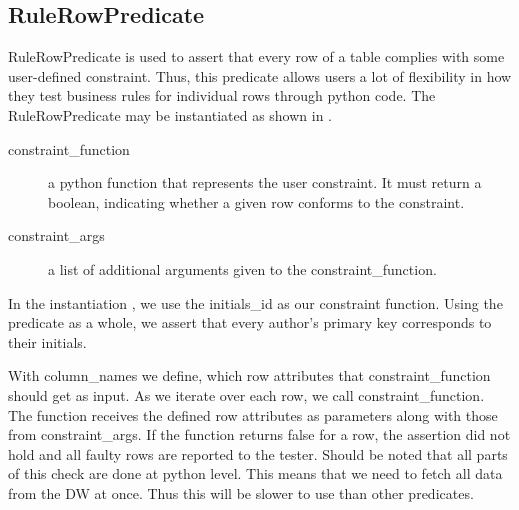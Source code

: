 \subsection{RuleRowPredicate}\label{RCP}
RuleRowPredicate is used to assert that every row of a table complies with some user-defined constraint. Thus, this predicate allows users a lot of flexibility in how they test business rules for individual rows through python code. The RuleRowPredicate may be instantiated as shown in .


\begin{description}
\item [constraint\_function] a python function that represents the user constraint. It must return a boolean, indicating whether a given row conforms to the constraint.
\item [constraint\_args] a list of additional arguments given to the constraint\_function.
\end{description}

In the instantiation , we use the initials\_id as our constraint function. Using the predicate as a whole, we assert that every author's primary key corresponds to their initials.

With column\_names we define, which row attributes that constraint\_function should get as input. As we iterate over each row, we call constraint\_function. The function receives the defined row attributes as parameters along with those from constraint\_args. If the function returns false for a row, the assertion did not hold and all faulty rows are reported to the tester. Should be noted that all parts of this check are done at python level. This means that we need to fetch all data from the DW at once. Thus this will be slower to use than other predicates.
